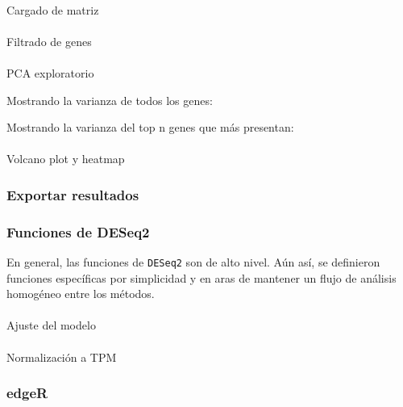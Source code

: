 \documentclass[
  12pt,
  letterpaper,
  DIV=11,
  numbers=noendperiod]{scrartcl}
\makeatletter
\let\oldparagraph\paragraph
\renewcommand{\paragraph}{
    \@ifstar
      \xxxParagraphStar
      \xxxParagraphNoStar
  }
\newcommand{\xxxParagraphStar}[1]{\oldparagraph*{#1}\mbox{}}
\newcommand{\xxxParagraphNoStar}[1]{\oldparagraph{#1}\mbox{}}
\makeatother
\begin{document}
\paragraph{Cargado de matriz}\label{cargado-de-matriz}

\paragraph{Filtrado de genes}\label{filtrado-de-genes}

\paragraph{PCA exploratorio}\label{pca-exploratorio}

Mostrando la varianza de todos los genes:

Mostrando la varianza del top n genes que más presentan:

\paragraph{Volcano plot y heatmap}\label{volcano-plot-y-heatmap}

\subsubsection{Exportar resultados}\label{exportar-resultados}

\subsubsection{Funciones de DESeq2}\label{funciones-de-deseq2}

En general, las funciones de \texttt{DESeq2} son de alto nivel. Aún así,
se definieron funciones específicas por simplicidad y en aras de
mantener un flujo de análisis homogéneo entre los métodos.

\paragraph{Ajuste del modelo}\label{ajuste-del-modelo}

\paragraph{Normalización a TPM}\label{normalizaciuxf3n-a-tpm}

\subsubsection{edgeR}\label{edger}
\end{document}
